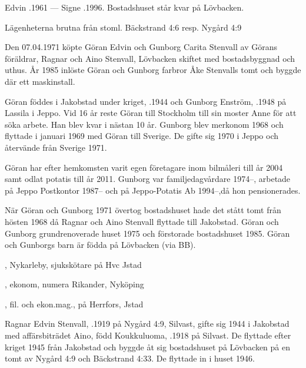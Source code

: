 Edvin .1961  ---  Signe .1996. Bostadshuset står kvar på Lövbacken.



Lägenheterna brutna från stoml. Bäckstrand 4:6 resp. Nygård 4:9



Den 07.04.1971 köpte Göran Edvin och Gunborg Carita Stenvall av Görans föräldrar, Ragnar och Aino Stenvall,  Lövbacken skiftet med bostadsbyggnad och uthus. År 1985 inlöste Göran och Gunborg farbror Åke Stenvalls tomt och byggde där ett maskinstall.

Göran föddes i Jakobstad under kriget, .1944 och Gunborg Enström, .1948 på Lassila i Jeppo. Vid 16 år reste Göran till Stockholm till sin moster Anne för att söka arbete. Han blev kvar i nästan 10 år. Gunborg blev merkonom 1968 och flyttade i januari 1969 med Göran till Sverige. De gifte sig 1970 i Jeppo och återvände från Sverige 1971.

Göran har efter hemkomsten varit egen företagare inom bilmåleri till år 2004 samt odlat potatis till år 2011. Gunborg var familjedagvårdare 1974--, arbetade på Jeppo Postkontor 1987-- och på Jeppo-Potatis Ab 1994--,då hon pensionerades.

När Göran och Gunborg 1971 övertog bostadshuset hade det stått tomt från hösten 1968 då Ragnar och Aino Stenvall flyttade till Jakobstad. Göran och Gunborg grundrenoverade huset 1975 och förstorade bostadshuset 1985.
Göran och Gunborgs barn är födda på Lövbacken (via BB).
\begin{jhchildren}
  \item {}, Nykarleby, sjukskötare på Hvc Jstad
  \item {}, ekonom, numera Rikander, Nyköping
  \item {}, fil. och ekon.mag., på Herrfors, Jstad
\end{jhchildren}


Ragnar Edvin Stenvall, .1919 på Nygård 4:9, Silvast, gifte sig 1944 i Jakobstad med affärsbiträdet Aino, född Koukkuluoma, .1918 på Silvast. De flyttade efter kriget 1945 från Jakobstad	och byggde åt sig bostadshuset på Lövbacken på en tomt av Nygård 4:9 och Bäckstrand 4:33. De flyttade in i huset 1946.

